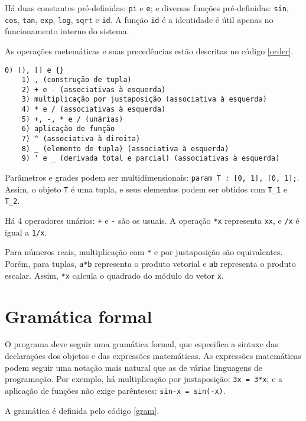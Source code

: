 Há duas constantes pré-definidas: \texttt{pi} e \texttt{e}; e diversas funções pré-definidas:
\texttt{sin}, \texttt{cos}, \texttt{tan},
\texttt{exp}, \texttt{log}, \texttt{sqrt} e \texttt{id}.
A função \texttt{id} é a identidade é útil apenas no funcionamento interno do sistema.

As operações metemáticas e suas precedências estão descritas no código \ref{order}.

\newpage
\begin{lstlisting}[caption=Ordem das operações,label=order]
    0) (), [] e {}
    1) , (construção de tupla)
    2) + e - (associativas à esquerda)
    3) multiplicação por justaposição (associativa à esquerda)
    4) * e / (associativas à esquerda)
    5) +, -, * e / (unárias)
    6) aplicação de função
    7) ^ (associativa à direita)
    8) _ (elemento de tupla) (associativa à esquerda)
    9) ' e _ (derivada total e parcial) (associativas à esquerda)
\end{lstlisting}

Parâmetros e grades podem ser multidimensionais:
\texttt{param T : [0, 1], [0, 1];}. Assim, o objeto \texttt{T} é uma tupla,
e seus elementos podem ser obtidos com \texttt{T\_1} e \texttt{T\_2}.

Há 4 operadores unários: \texttt{+} e \texttt{-} são os usuais.
A operação \texttt{*x} representa \texttt{xx}, e \texttt{/x} é igual a \texttt{1/x}.

Para números reais, multiplicação com \texttt{*} e por justaposição são equivalentes.
Porém, para tuplas, \texttt{a*b} representa o produto vetorial
e \texttt{ab} representa o produto escalar.
Assim, \texttt{*x} calcula o quadrado do módulo do vetor \texttt{x}.

\section{Gramática formal}

O programa deve seguir uma gramática formal, 
que especifica a sintaxe das declarações dos objetos e das expressões matemáticas.
As expressões matemáticas podem seguir uma notação mais natural
que as de várias linguagens de programação.
Por exemplo, há multiplicação por justaposição: \texttt{3x = 3*x};
e a aplicação de funções não exige parênteses: \texttt{sin-x = sin(-x)}.

A gramática é definida pelo código \ref{gram}.

